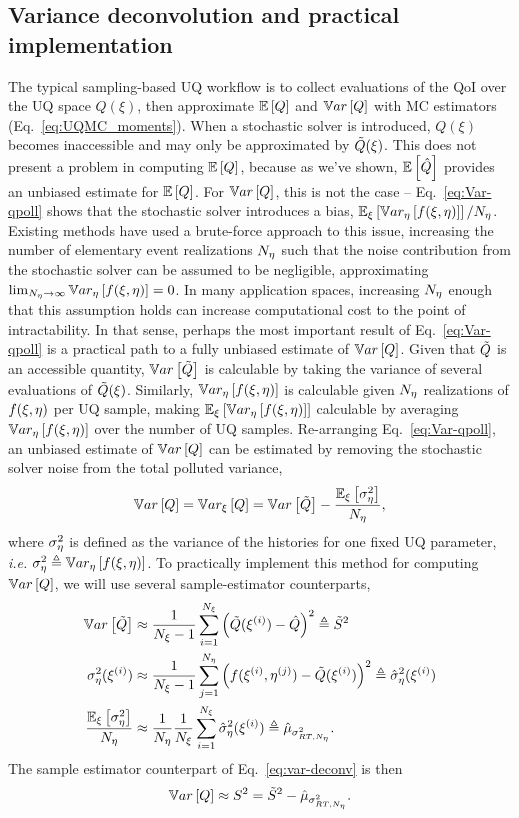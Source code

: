 \subsection{Variance deconvolution and practical implementation}
The typical sampling-based UQ workflow is to collect evaluations of the QoI over the UQ space $Q(\xi)$, then approximate $\mathbb{E}\left[Q\right]$ and $\mathbb{V}ar\left[Q\right]$ with MC estimators (Eq.~\eqref{eq:UQMC_moments}). When a stochastic solver is introduced, $Q(\xi)$ becomes inaccessible and may only be approximated by $\tilde{Q}(\xi)$. This does not present a problem in computing $\mathbb{E}\left[Q\right]$, because as we've shown, $\mathbb{E}\left[\hat{Q}\right]$ provides an unbiased estimate for $\mathbb{E}\left[Q\right]$. For $\mathbb{V}ar\left[Q\right]$, this is not the case -- Eq.~\eqref{eq:Var-qpoll} shows that the stochastic solver introduces a bias, $\mathbb{E}_\xi\left[\mathbb{V}ar_\eta\left[f(\xi,\eta)\right]\right]/{N_\eta}$. Existing methods \cite{MCMC-paper} have used a brute-force approach to this issue, increasing the number of elementary event realizations ${N_\eta}$ such that the noise contribution from the stochastic solver can be assumed to be negligible, approximating $\lim_{{N_\eta} \to \infty} \mathbb{V}ar_\eta\left[f(\xi,\eta)\right] = 0$. In many application spaces, increasing ${N_\eta}$ enough that this assumption holds can increase computational cost to the point of intractability. In that sense, perhaps the most important result of Eq.~\eqref{eq:Var-qpoll} is a practical path to a fully unbiased estimate of $\mathbb{V}ar\left[Q\right]$. Given that $\tilde{Q}$ is an accessible quantity, $\mathbb{V}ar\left[\tilde{Q}\right]$ is calculable by taking the variance of several evaluations of $\tilde{Q}(\xi)$. Similarly, $\mathbb{V}ar_\eta\left[f(\xi,\eta)\right]$ is calculable given ${N_\eta}$ realizations of $f(\xi,\eta)$ per UQ sample, making $\mathbb{E}_\xi\left[\mathbb{V}ar_\eta\left[f(\xi,\eta)\right]\right]$ calculable by averaging $\mathbb{V}ar_\eta\left[f(\xi,\eta)\right]$ over the number of UQ samples. Re-arranging Eq.~\eqref{eq:Var-qpoll}, an unbiased estimate of $\mathbb{V}ar\left[Q\right]$ can be estimated by removing the stochastic solver noise from the total polluted variance,
\begin{equation}\label{eq:var-deconv}
    \mathbb{V}ar\left[Q\right] = \mathbb{V}ar_\xi\left[Q\right] = \mathbb{V}ar\left[\tilde{Q}\right] - \frac{\mathbb{E}_\xi\left[\sigma^2_\eta\right]}{{N_\eta}} ,
\end{equation}
where $\sigma^2_\eta$ is defined as the variance of the histories for one fixed UQ parameter, \textit{i.e.} $\sigma^2_\eta \triangleq \mathbb{V}ar_\eta\left[f(\xi,\eta)\right]$. To practically implement this method for computing $\mathbb{V}ar\left[Q\right]$, we will use several sample-estimator counterparts,
\begin{equation}
    \begin{split}
        \mathbb{V}ar\left[\tilde{Q}\right] &\approx \frac{1}{{N_\xi}-1}\sum_{i=1}^{{N_\xi}}\left( \tilde{Q}(\xi^{(i)}) - \hat{Q} \right)^2 \triangleq \tilde{S}^2 \\
        \sigma^2_\eta(\xi^{(i)}) &\approx \frac{1}{{N_\xi}-1}\sum_{j=1}^{N_\eta}\left( f(\xi^{(i)},\eta^{(j)}) - \tilde{Q}(\xi^{(i)}) \right)^2 \triangleq \hat{\sigma}^2_\eta(\xi^{(i)}) \\
        \frac{\mathbb{E}_\xi\left[\sigma^2_\eta\right]}{{N_\eta}} &\approx \frac{1}{{N_\eta}} \frac{1}{{N_\xi}} \sum_{i=1}^{{N_\xi}} \hat{\sigma}^2_\eta(\xi^{(i)}) \triangleq \hat{\mu}_{\sigma^2_{RT,{N_\eta}}} .
    \end{split}
\end{equation}
The sample estimator counterpart of Eq.~\eqref{eq:var-deconv} is then
\begin{equation} \label{eq:sampling-var-deconv}
 \mathbb{V}ar\left[Q\right] \approx S^2 = \tilde{S}^2 - \hat{\mu}_{\sigma^2_{RT,{N_\eta}}}.
\end{equation}




